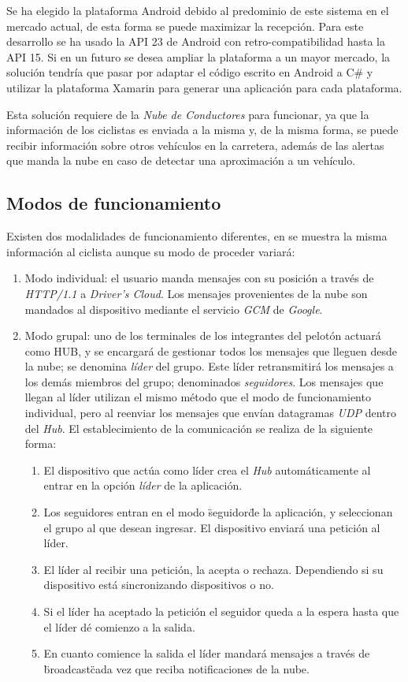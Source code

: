 Se ha elegido la plataforma Android debido al predominio de este sistema en el mercado actual, de esta forma se puede maximizar la recepción. Para este desarrollo se ha usado la API 23 de Android con retro-compatibilidad hasta la API 15. Si en un futuro se desea ampliar la plataforma a un mayor mercado, la solución tendría que pasar por adaptar el código escrito en Android a C\# y utilizar la plataforma Xamarin para generar una aplicación para cada plataforma.

Esta solución requiere de la \emph{Nube de Conductores} para funcionar, ya que la información de los ciclistas es enviada a la misma y, de la misma forma, se puede recibir información sobre otros vehículos en la carretera, además de las alertas que manda la nube en caso de detectar una aproximación a un vehículo.

\subsection{Modos de funcionamiento}\label{ssection:commHUB}
Existen dos modalidades de funcionamiento diferentes, en se muestra la misma información al ciclista aunque su modo de proceder variará:
		
\begin{enumerate}
	\item Modo individual: el usuario manda mensajes con su posición a través de \emph{HTTP/1.1} a \emph{Driver's Cloud}. Los mensajes provenientes de la nube son mandados al dispositivo mediante el servicio \emph{GCM} de \emph{Google}.	
	\item Modo grupal: uno de los terminales de los integrantes del pelotón actuará como HUB, y se encargará de gestionar todos los mensajes que lleguen desde la nube; se denomina \emph{líder} del grupo. Este líder retransmitirá los mensajes a los demás miembros del grupo; denominados \emph{seguidores}. Los mensajes que llegan al líder utilizan el mismo método que el modo de funcionamiento individual, pero al reenviar los mensajes que envían datagramas \emph{UDP} dentro del \emph{Hub}. El establecimiento de la comunicación se realiza de la siguiente forma:
	\begin{enumerate}
		\item El dispositivo que actúa como líder crea el \emph{Hub} automáticamente al entrar en la opción \emph{líder} de la aplicación.
		\item Los seguidores entran en el modo \"seguidor\" de la aplicación, y seleccionan el grupo al que desean ingresar. El dispositivo enviará una petición al líder.
		\item El líder al recibir una petición, la acepta o rechaza. Dependiendo si su dispositivo está sincronizando dispositivos o no.
		\item Si el líder ha aceptado la petición el seguidor queda a la espera hasta que el líder dé comienzo a la salida.
		\item En cuanto comience la salida el líder mandará mensajes a través de \"broadcast\" cada vez que reciba notificaciones de la nube.
	\end{enumerate}
\end{enumerate}

